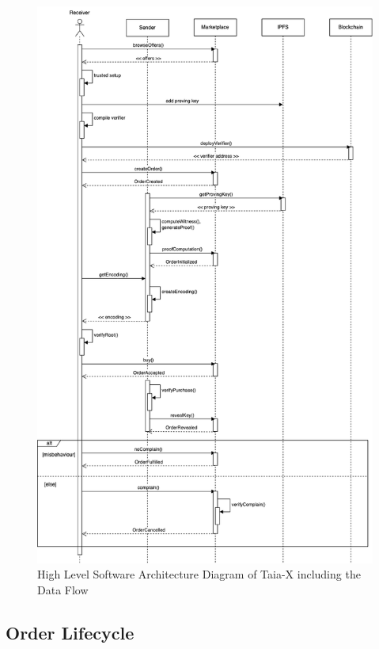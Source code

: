 \begin{figure}[!htb]
    \centering
    \includegraphics[width=14cm]{images/protocol.png}
    \caption[High Level Software Architecture Diagram of Taia-X]{High Level Software Architecture Diagram of Taia-X including the Data Flow}
    \label{fig:arch}
\end{figure}

\subsection{Order Lifecycle}
\label{subsection:lifecycle}

